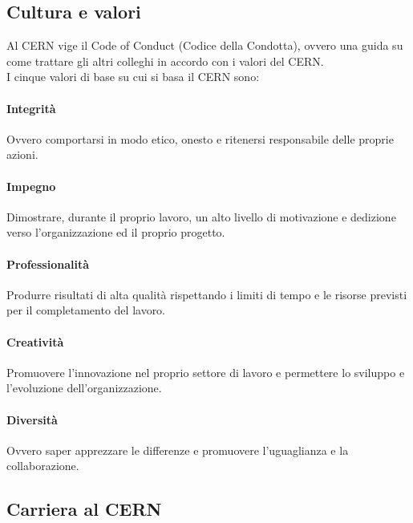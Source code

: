 		\subsection{Cultura e valori} \label{subsec:CERN;lavoro;cultura_e_valori}
		
			Al \ac{CERN} vige il Code of Conduct (Codice della Condotta), ovvero una guida su come trattare gli altri colleghi in accordo con i valori del \ac{CERN}. \cite{cern:culture_values}\\
			I cinque valori di base su cui si basa il \ac{CERN} sono:
			
			\paragraph{Integrit\`{a}}Ovvero comportarsi in modo etico, onesto e ritenersi responsabile delle proprie azioni.
			
			\paragraph{Impegno}Dimostrare, durante il proprio lavoro, un alto livello di motivazione e dedizione verso l'organizzazione ed il proprio progetto.
			
			\paragraph{Professionalit\`{a}}Produrre risultati di alta qualità rispettando i limiti di tempo e le risorse previsti per il completamento del lavoro.
			
			\paragraph{Creativit\`{a}}Promuovere l'innovazione nel proprio settore di lavoro e permettere lo sviluppo e l'evoluzione dell'organizzazione.
			
			\paragraph{Diversit\`{a}}Ovvero saper apprezzare le differenze e promuovere l'uguaglianza e la collaborazione.
		
		\subsection{Carriera al CERN} \label{subsec:CERN;lavoro;carriera}
		
